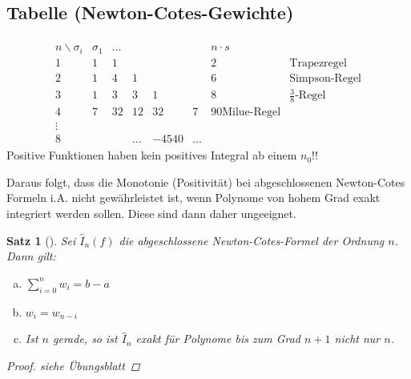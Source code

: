 \documentclass[ngerman,fontsize=11pt, paper=a4, parskip=half, titlepage=true, toc=bib]{scrbook}
\theoremstyle{definition}
\theoremstyle{plain}
\newtheorem{Satz}[Def]{Satz}		%
\newcommand{\subsectione}[1]{\addtocounter{Def}{1}\subsection{#1}}
\newenvironment{Satze}[1][]{ %
  \begin{Satz}[#1]  }
  { \end{Satz}
  \addtocounter{subsection}{1}}
\begin{document}
\subsectione{Tabelle (Newton-Cotes-Gewichte)}
\begin{align*}
  \begin{array}{cccccccl}
    n\backslash \sigma_i &\sigma_1&\dots&&&& n\cdot s\\
    1 & 1&1&&&&2& \text{Trapezregel}\\
    2&1&4&1&&&6 & \text{Simpson-Regel}\\
    3&1&3&3&1&&8& \text{$\frac{3}{8}$-Regel}\\
    4&7&32&12&32&7&90 \text{Milue-Regel}\\
    \vdots\\
    8&&&\dots &-4540&\dots
  \end{array}
\end{align*}
Positive Funktionen haben kein positives Integral ab einem $n_0$!!




Daraus folgt, dass die Monotonie (Positivität) 
bei abgeschlossenen Newton-Cotes Formeln i.A. nicht gewährleistet ist,
wenn Polynome von hohem Grad exakt integriert werden sollen.
Diese sind dann daher ungeeignet.


\begin{Satze}\label{7.2.5}
  Sei $\hat{I}_n(f) $ die abgeschlossene Newton-Cotes-Formel
  der Ordnung $n$.
  Dann gilt:
  \begin{enumerate}[a)]
  \item $\sum_{i=0}^nw_i= b-a$
  \item $w_i=w_{n-i}$
  \item Ist $n$ gerade, so ist $\hat{I}_n$ exakt für Polynome bis zum
    Grad $n+1$ nicht nur $n$.
  \end{enumerate}

  \begin{proof} siehe Übungsblatt \end{proof}
\end{Satze}
\end{document}
